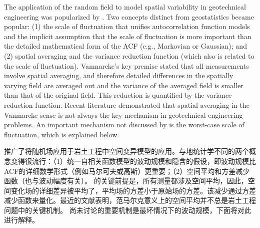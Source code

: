 \begin{ParaColumn}
    \switchcolumn

    The application of the random field to model spatial variability in geotechnical engineering was popularized by \citet{Vanmarcke19771227}. Two concepts distinct from geostatistics became popular: (1) the scale of fluctuation that unifies autocorrelation function models and the implicit assumption that the scale of fluctuation is more important than the detailed mathematical form of the ACF (e.g., Markovian or Gaussian); and (2) spatial averaging and the variance reduction function (which also is related to the scale of fluctuation). Vanmarcke's \citeyearpar{Vanmarcke1983} key premise stated that all measurements involve spatial averaging, and therefore detailed differences in the spatially varying field are averaged out and the variance of the averaged field is smaller than that of the original field. This reduction is quantified by the variance reduction function. Recent literature demonstrated that spatial averaging in the Vanmarcke sense is not always the key mechanism in geotechnical engineering problems. An important mechanism not discussed by \citet{Vanmarcke19771227,Vanmarcke1983} is the worst-case scale of fluctuation, which is explained below.

    \switchcolumn

    \citet{Vanmarcke19771227}推广了将随机场应用于岩土工程中空间变异模型的应用。与地统计学不同的两个概念变得很流行：（1）统一自相关函数模型的波动规模和隐含的假设，即波动规模比ACF的详细数学形式（例如马尔可夫或高斯）更重要；（2）空间平均和方差减少函数（也与波动幅度有关）。 \citet{Vanmarcke1983}的关键前提是，所有测量都涉及空间平均，因此，空间变化场的详细差异被平均了，平均场的方差小于原始场的方差。该减少通过方差减少函数来量化。最近的文献表明，范马尔克意义上的空间平均并不总是岩土工程问题中的关键机制。 \citet{Vanmarcke19771227,Vanmarcke1983}尚未讨论的重要机制是最坏情况下的波动规模，下面将对此进行解释。
    
\end{ParaColumn}